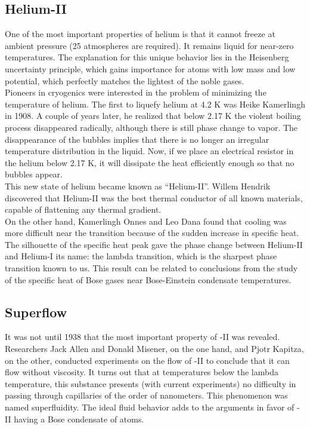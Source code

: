 \documentclass{article}
\begin{document}
\subsection{Helium-II}
One of the most important properties of helium is that it cannot freeze at ambient pressure (25 atmospheres are required). It remains liquid for near-zero temperatures. The explanation for this unique behavior lies in the Heisenberg uncertainty principle, which gains importance for atoms with low mass and low potential, which perfectly matches the lightest of the noble gases.
\\

Pioneers in cryogenics were interested in the problem of minimizing the temperature of helium. The first to liquefy helium at 4.2 K was Heike Kamerlingh in 1908. A couple of years later, he realized that below 2.17 K the violent boiling process disappeared radically, although there is still phase change to vapor. The disappearance of the bubbles implies that there is no longer an irregular temperature distribution in the liquid. Now, if we place an electrical resistor in the helium below 2.17 K, it will dissipate the heat efficiently enough so that no bubbles appear. 
\\

This new state of helium became known as “Helium-II”. Willem Hendrik discovered that Helium-II was the best thermal conductor of all known materials, capable of flattening any thermal gradient. 
\\

On the other hand, Kamerlingh Onnes and Leo Dana found that cooling was more difficult near the transition because of the sudden increase in specific heat. The silhouette of the specific heat peak gave the phase change between Helium-II and Helium-I its name: the lambda transition, which is the sharpest phase transition known to us. This result can be related to conclusions from the study of the specific heat of Bose gases near Bose-Einstein condensate temperatures.
\\

\subsection{Superflow}

It was not until 1938 that the most important property of -II was revealed.
Researchers Jack Allen and Donald Misener, on the one hand, and Pjotr Kapitza, on the other, conducted experiments on the flow of -II to conclude that it can flow without viscosity. It turns out that at temperatures below the lambda temperature, this substance presents (with current experiments) no difficulty in passing through capillaries of the order of nanometers. This phenomenon was named superfluidity. The ideal fluid behavior adds to the arguments in favor of -II having a Bose condensate of  atoms.
\\
\end{document}
